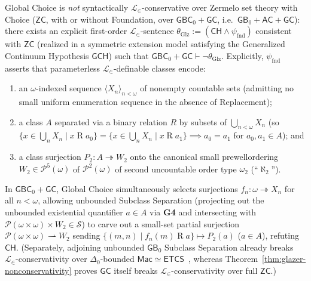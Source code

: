 \begin{theorem}\label{thm:glazer-nonconservativity}%
%
Global Choice is \emph{not} syntactically $\mathcal{L}_\in$-conservative over Zermelo set theory with Choice ($\mathsf{ZC}$, with or without Foundation, over $\mathsf{GBC}_0 + \mathsf{GC}$, i.e.\ $\mathsf{GB}_0 + \mathsf{AC} + \mathsf{GC}$): there exists an explicit first-order $\mathcal{L}_\in$-sentence $\theta_{\mathrm{Glz}} := (\mathsf{CH} \wedge \psi_{\mathrm{fnd}})$ consistent with $\mathsf{ZC}$ (realized in a symmetric extension model satisfying the Generalized Continuum Hypothesis $\mathsf{GCH}$) such that $\mathsf{GBC}_0 + \mathsf{GC} \vdash \neg\theta_{\mathrm{Glz}}$. Explicitly, $\psi_{\mathrm{fnd}}$ asserts that parameterless $\mathcal{L}_\in$-definable classes encode:
\begin{enumerate}[label=\textup{(\alph*)},leftmargin=1.8em]
  \item an $\omega$-indexed sequence $\langle X_n \rangle_{n < \omega}$ of nonempty countable sets (admitting no small uniform enumeration sequence in the absence of Replacement);
  \item a class $A$ separated via a binary relation $R$ by subsets of $\bigcup_{n < \omega} X_n$ (so $\{x \in \bigcup_n X_n \mid x \mathrel{R} a_0\} = \{x \in \bigcup_n X_n \mid x \mathrel{R} a_1\} \implies a_0 = a_1$ for $a_0, a_1 \in A$); and
  \item a class surjection $P_2 : A \twoheadrightarrow W_2$ onto the canonical small prewellordering $W_2 \in \mathcal{P}^5(\omega)$ of $\mathcal{P}^2(\omega)$ of second uncountable order type $\omega_2$ (``$\aleph_2$'').
\end{enumerate}
In $\mathsf{GBC}_0 + \mathsf{GC}$, Global Choice simultaneously selects surjections $f_n : \omega \twoheadrightarrow X_n$ for all $n < \omega$, allowing unbounded Subclass Separation (projecting out the unbounded existential quantifier $a \in A$ via \textbf{G4} and intersecting with $\mathcal{P}(\omega \times \omega) \times W_2 \in \mathcal{S}$) to carve out a small-set partial surjection $\mathcal{P}(\omega \times \omega) \rightharpoonup W_2$ sending $\{(m, n) \mid f_n(m) \mathrel{R} a\} \mapsto P_2(a)$ ($a \in A$), refuting $\mathsf{CH}$. (Separately, adjoining unbounded $\mathsf{GB}_0$ Subclass Separation already breaks $\mathcal{L}_\in$-conservativity over $\Delta_0$-bounded $\mathsf{Mac} \simeq \mathsf{ETCS}$~\cite{Mathias01}, whereas Theorem~\ref{thm:glazer-nonconservativity} proves $\mathsf{GC}$ itself breaks $\mathcal{L}_\in$-conservativity over full $\mathsf{ZC}$.)
\end{theorem}

